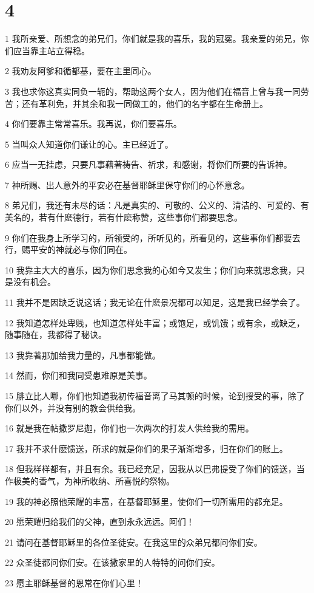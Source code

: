 \chapter{4}

\par 1 我所亲爱、所想念的弟兄们，你们就是我的喜乐，我的冠冕。我亲爱的弟兄，你们应当靠主站立得稳。
\par 2 我劝友阿爹和循都基，要在主里同心。
\par 3 我也求你这真实同负一轭的，帮助这两个女人，因为他们在福音上曾与我一同劳苦；还有革利免，并其余和我一同做工的，他们的名字都在生命册上。
\par 4 你们要靠主常常喜乐。我再说，你们要喜乐。
\par 5 当叫众人知道你们谦让的心。主已经近了。
\par 6 应当一无挂虑，只要凡事藉著祷告、祈求，和感谢，将你们所要的告诉神。
\par 7 神所赐、出人意外的平安必在基督耶稣里保守你们的心怀意念。
\par 8 弟兄们，我还有未尽的话：凡是真实的、可敬的、公义的、清洁的、可爱的、有美名的，若有什麽德行，若有什麽称赞，这些事你们都要思念。
\par 9 你们在我身上所学习的，所领受的，所听见的，所看见的，这些事你们都要去行，赐平安的神就必与你们同在。
\par 10 我靠主大大的喜乐，因为你们思念我的心如今又发生；你们向来就思念我，只是没有机会。
\par 11 我并不是因缺乏说这话；我无论在什麽景况都可以知足，这是我已经学会了。
\par 12 我知道怎样处卑贱，也知道怎样处丰富；或饱足，或饥饿；或有余，或缺乏，随事随在，我都得了秘诀。
\par 13 我靠著那加给我力量的，凡事都能做。
\par 14 然而，你们和我同受患难原是美事。
\par 15 腓立比人哪，你们也知道我初传福音离了马其顿的时候，论到授受的事，除了你们以外，并没有别的教会供给我。
\par 16 就是我在帖撒罗尼迦，你们也一次两次的打发人供给我的需用。
\par 17 我并不求什麽馈送，所求的就是你们的果子渐渐增多，归在你们的账上。
\par 18 但我样样都有，并且有余。我已经充足，因我从以巴弗提受了你们的馈送，当作极美的香气，为神所收纳、所喜悦的祭物。
\par 19 我的神必照他荣耀的丰富，在基督耶稣里，使你们一切所需用的都充足。
\par 20 愿荣耀归给我们的父神，直到永永远远。阿们！
\par 21 请问在基督耶稣里的各位圣徒安。在我这里的众弟兄都问你们安。
\par 22 众圣徒都问你们安。在该撒家里的人特特的问你们安。
\par 23 愿主耶稣基督的恩常在你们心里！


